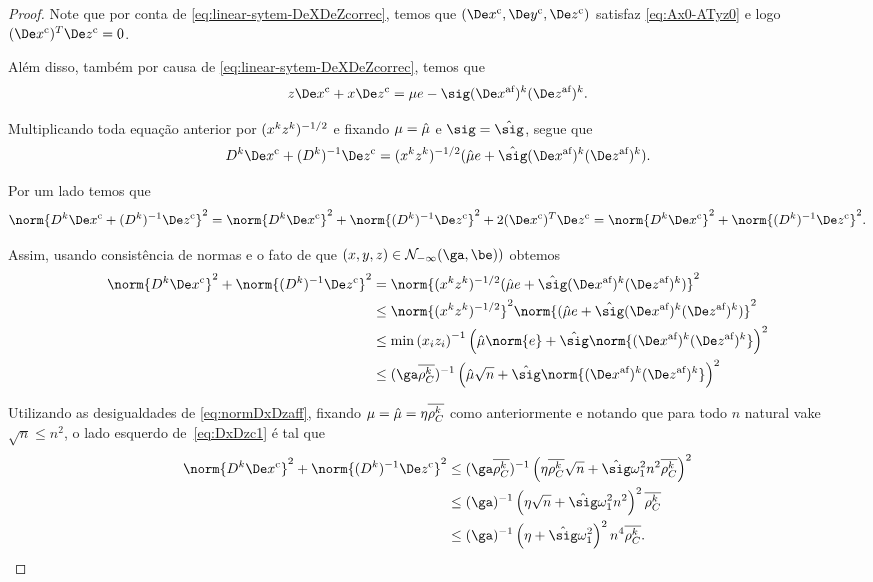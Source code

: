 \begin{proof}
	Note que por conta de \eqref{eq:linear-sytem-DeXDeZcorrec}, temos que $(\Decox,\Decoy,\Decoz)$ satisfaz \eqref{eq:Ax0-ATyz0} e logo $(\Decox)^{T}\Decoz = 0$. 

	


	Além disso, também por causa de \eqref{eq:linear-sytem-DeXDeZcorrec}, temos que
	\[
	z\Decox + x\Decoz = \mu e  - \sig \dekx  \dekz .
	\]

	Multiplicando toda equação anterior por $(  x^{k} z^{k}  )^{-1/2}$ e  fixando $\mu = \hat{\mu}$ e $\sig = \nextsig $, segue que 
	\[
		\Dk\Decox + \Dik\Decoz = (  \xk \zk  )^{-1/2}(\nextmu e + \nextsig \dekx  \dekz ).
	\] 

	Por um lado temos que 
	\[
		\norm{\Dk\Decox + \Dik\Decoz}^{2} = \norm{\Dk\Decox}^{2} + \norm{\Dik\Decoz}^{2} + 2(\Decox)^{T}\Decoz = \norm{\Dk\Decox}^{2} + \norm{\Dik\Decoz}^{2}.
	\]

Assim, usando consistência de normas e o fato de que  $(x,y,z)\in\Nset_{-\infty}(\ga,\be))$ obtemos
\begin{align}
	\norm{\Dk\Decox}^{2} + \norm{\Dik\Decoz}^{2} & = \norm{(  \xk \zk  )^{-1/2}(\nextmu e+ \nextsig \dekx  \dekz )}^{2} \notag\\ 
												& \leq \norm{(  \xk \zk  )^{-1/2}}^{2}\norm{(\nextmu e+ \nextsig \dekx  \dekz )}^{2} \notag\\ 
												& \leq \min\left({x_iz_i}\right)^{-1}\left(\nextmu\norm{ e} +{\nextsig}\norm{ \dekx  \dekz }\right)^{2}\notag\\
												& \leq (\ga\dbvec{\rho_C^k })^{-1}\left(\nextmu\sqrt{n} +{\nextsig}\norm{ \dekx  \dekz }\right)^{2} \label{eq:DxDzc1}		
\end{align}



Utilizando as desigualdades de \eqref{eq:normDxDzaff}, fixando $\mu = \hat{\mu} =\eta \overline{\rho_C^k }$ como anteriormente e notando que para todo $n$ natural vake $\sqrt{n} \leq n^{2}$, o lado esquerdo de~\eqref{eq:DxDzc1} é tal que
\begin{align*}
	\norm{\Dk\Decox}^{2} + \norm{\Dik\Decoz}^{2}
							& \leq (\ga\dbvec{\rho_C^k })^{-1}\left(\eta\dbvec{\rho_C^k }\sqrt{n} +{\nextsig} \omega_1^{2} n^{2}\dbvec{\rho_C^k }\right)^{2}\\
							& \leq (\ga)^{-1}\left(\eta\sqrt{n} +{\nextsig} \omega_1^{2} n^{2}\right)^{2}\dbvec{\rho_C^k }\\
							& \leq (\ga)^{-1}\left(\eta +{\nextsig} \omega_1^{2} \right)^{2}n^{4}\dbvec{\rho_C^k }.
\end{align*}


\end{proof}
